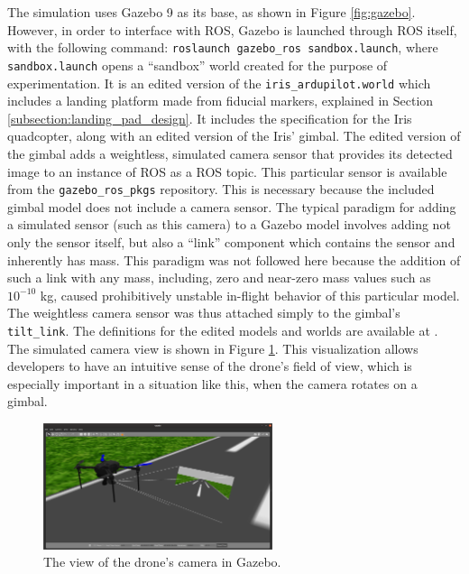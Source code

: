 
The simulation uses Gazebo 9 as its base, as shown in Figure \ref{fig:gazebo}. However, in order to interface with ROS, Gazebo is launched through ROS itself, with the following command: \texttt{roslaunch gazebo\_ros sandbox.launch}, where \texttt{sandbox.launch} opens a ``sandbox'' world created for the purpose of experimentation. It is an edited version of the \texttt{iris\_ardupilot.world} which includes a landing platform made from fiducial markers, explained in Section \ref{subsection:landing_pad_design}. It includes the specification for the Iris quadcopter, along with an edited version of the Iris' gimbal. The edited version of the gimbal adds a weightless, simulated camera sensor that provides its detected image to an instance of ROS as a ROS topic. This particular sensor is available from the \texttt{gazebo\_ros\_pkgs} repository. This is necessary because the included gimbal model does not include a camera sensor. The typical paradigm for adding a simulated sensor (such as this camera) to a Gazebo model involves adding not only the sensor itself, but also a ``link'' component which contains the sensor and inherently has mass. This paradigm was not followed here because the addition of such a link with any mass, including, zero and near-zero mass values such as $10^{-10}$ kg, caused prohibitively unstable in-flight behavior of this particular model. The weightless camera sensor was thus attached simply to the gimbal's \texttt{tilt\_link}. The definitions for the edited models and worlds are available at \cite{edited_ardupilot_gazebo}.
The simulated camera view is shown in Figure \ref{fig:gazebo_camera}. This visualization allows developers to have an intuitive sense of the drone's field of view, which is especially important in a situation like this, when the camera rotates on a gimbal. 

\begin{figure}
    \centering
    \includegraphics[width=0.6\textwidth]{images/gazebo_camera.png}
    \caption{The view of the drone's camera in Gazebo.}
    \label{fig:gazebo_camera}
\end{figure}

